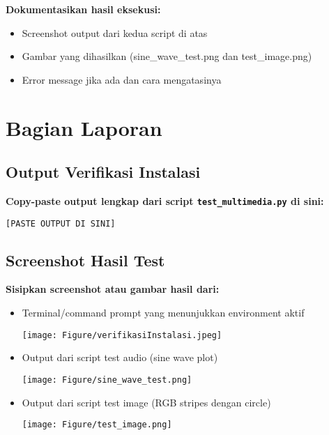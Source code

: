 \documentclass[11pt,a4paper]{article}
\begin{document}
\textbf{Dokumentasikan hasil eksekusi:}
\begin{itemize}
    \item Screenshot output dari kedua script di atas
    \item Gambar yang dihasilkan (sine\_wave\_test.png dan test\_image.png)
    \item Error message jika ada dan cara mengatasinya
\end{itemize}

\section{Bagian Laporan}

\subsection{Output Verifikasi Instalasi}
\textbf{Copy-paste output lengkap dari script \texttt{test\_multimedia.py} di sini:}

\begin{lstlisting}[caption=Output verifikasi instalasi]
[PASTE OUTPUT DI SINI]
\end{lstlisting}

\subsection{Screenshot Hasil Test}
\textbf{Sisipkan screenshot atau gambar hasil dari:}
\begin{itemize}
    \item Terminal/command prompt yang menunjukkan environment aktif
    \begin{center}
        \texttt{[image: Figure/verifikasiInstalasi.jpeg]}
        \vspace{0.1cm}
    \end{center}
    \item Output dari script test audio (sine wave plot)
    \begin{center}
        \texttt{[image: Figure/sine\_wave\_test.png]}
        \vspace{0.1cm}
    \end{center}
    \item Output dari script test image (RGB stripes dengan circle)
    \begin{center}
        \texttt{[image: Figure/test\_image.png]}
        \vspace{0.1cm}
    \end{center}
\end{itemize}
\end{document}
